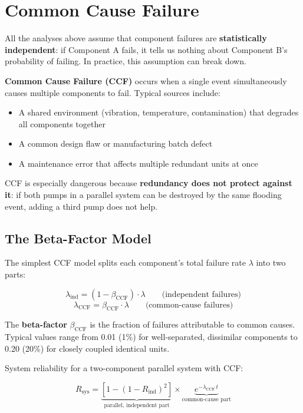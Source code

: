 \documentclass[
  letterpaper,
  DIV=11,
  numbers=noendperiod]{scrreprt}
\providecommand{\tightlist}{%
  \setlength{\itemsep}{0pt}\setlength{\parskip}{0pt}}
\begin{document}
\section{Common Cause Failure}\label{common-cause-failure}

All the analyses above assume that component failures are
\textbf{statistically independent}: if Component A fails, it tells us
nothing about Component B's probability of failing. In practice, this
assumption can break down.

\textbf{Common Cause Failure (CCF)} occurs when a single event
simultaneously causes multiple components to fail. Typical sources
include:

\begin{itemize}
\tightlist
\item
  A shared environment (vibration, temperature, contamination) that
  degrades all components together
\item
  A common design flaw or manufacturing batch defect
\item
  A maintenance error that affects multiple redundant units at once
\end{itemize}

CCF is especially dangerous because \textbf{redundancy does not protect
against it}: if both pumps in a parallel system can be destroyed by the
same flooding event, adding a third pump does not help.

\subsection{The Beta-Factor Model}\label{the-beta-factor-model}

The simplest CCF model splits each component's total failure rate
\(\lambda\) into two parts:

\[\lambda_{\text{ind}} = (1 - \beta_{\text{CCF}}) \cdot \lambda \qquad \text{(independent failures)}\]
\[\lambda_{\text{CCF}} = \beta_{\text{CCF}} \cdot \lambda \qquad \text{(common-cause failures)}\]

The \textbf{beta-factor} \(\beta_{\text{CCF}}\) is the fraction of
failures attributable to common causes. Typical values range from 0.01
(1\%) for well-separated, dissimilar components to 0.20 (20\%) for
closely coupled identical units.

System reliability for a two-component parallel system with CCF:

\[R_{\text{sys}} = \underbrace{\left[1 - (1 - R_{\text{ind}})^2\right]}_{\text{parallel, independent part}} \times \underbrace{e^{-\lambda_{\text{CCF}} \, t}}_{\text{common-cause part}}\]
\end{document}
